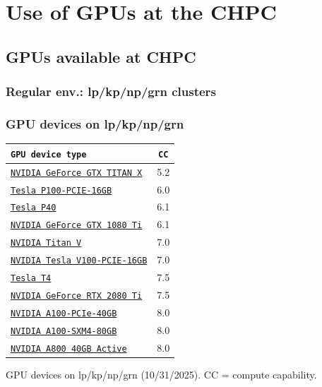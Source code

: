 \section{Use of GPUs at the CHPC}

\subsection{GPUs available at CHPC}

\subsubsection{Regular env.: lp/kp/np/grn clusters}

\begin{frame}
  \frametitle{GPU devices on lp/kp/np/grn}
  \begin{center}
    \small
    \begin{tabular}{l|c}
      \texttt{GPU device type} & \texttt{CC} \\
      \hline
      \href{https://www.nvidia.com/en-us/geforce/graphics-cards/geforce-gtx-titan-x/specifications/}{\texttt{NVIDIA GeForce GTX TITAN X}} & 5.2 \\
      \href{https://images.nvidia.com/content/tesla/pdf/nvidia-tesla-p100-PCIe-datasheet.pdf}{\texttt{Tesla P100-PCIE-16GB}} & 6.0 \\
      \href{https://www.nvidia.com/content/dam/en-zz/Solutions/design-visualization/documents/nvidia-p40-datasheet.pdf}{\texttt{Tesla P40}} & 6.1 \\
      \href{https://www.nvidia.com/en-us/geforce/10-series/}{\texttt{NVIDIA GeForce GTX 1080 Ti}} & 6.1 \\
      \href{https://www.gpuzoo.com/GPU-NVIDIA/Titan_V.html}{\texttt{NVIDIA Titan V}} & 7.0 \\
      \href{https://images.nvidia.com/content/technologies/volta/pdf/tesla-volta-v100-datasheet-letter-fnl-web.pdf}{\texttt{NVIDIA Tesla V100-PCIE-16GB}} & 7.0 \\
      \href{https://www.nvidia.com/content/dam/en-zz/Solutions/Data-Center/tesla-t4/t4-tensor-core-product-brief.pdf}{\texttt{Tesla T4}} & 7.5 \\
      \href{https://www.techpowerup.com/gpu-specs/geforce-rtx-2080-ti.c3305}{\texttt{NVIDIA GeForce RTX 2080 Ti}} & 7.5 \\
      \href{https://www.nvidia.com/content/dam/en-zz/Solutions/Data-Center/a100/pdf/nvidia-a100-datasheet-us-nvidia-1758950-r4-web.pdf}{\texttt{NVIDIA A100-PCIe-40GB}} & 8.0 \\
      \href{https://www.nvidia.com/content/dam/en-zz/Solutions/Data-Center/a100/pdf/nvidia-a100-datasheet-us-nvidia-1758950-r4-web.pdf}{\texttt{NVIDIA A100-SXM4-80GB}} & 8.0 \\
      \href{https://www.nvidia.com/en-us/design-visualization/a800/}{\texttt{NVIDIA A800 40GB Active}} & 8.0 \\
      \hline
    \end{tabular}
  \end{center}
  \par\small{GPU devices on lp/kp/np/grn (10/31/2025). CC = compute capability.}
\end{frame}


